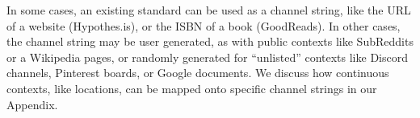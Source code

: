 In some cases, an existing standard can be used as a channel
string, like the URL of a website (Hypothes.is),
or the ISBN of a book (GoodReads).
In other cases, the channel string may be user generated,
as with public contexts like SubReddits or a Wikipedia pages,
or randomly generated for ``unlisted'' contexts like
Discord channels, Pinterest boards, or Google documents.
We discuss how continuous contexts, like locations, can be
mapped onto specific channel strings in our Appendix.




